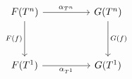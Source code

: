 \[\begin{tikzcd}
	{F(T^{n})} && {G(T^{n})} \\
	\\
	{F(T^{1})} && {G(T^{1})}
	\arrow["{F(f)}"', from=1-1, to=3-1]
	\arrow["{G(f)}", from=1-3, to=3-3]
	\arrow["{\alpha_{T^{n}}}", from=1-1, to=1-3]
	\arrow["{\alpha_{T^{1}}}"', from=3-1, to=3-3]
\end{tikzcd}\]